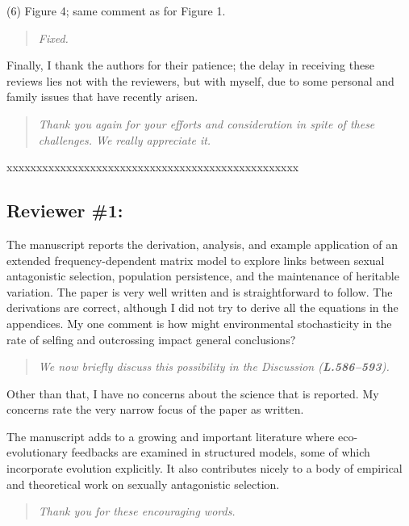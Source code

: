 \documentclass[11pt]{article}
\begin{document}
\noindent (6) Figure 4; same comment as for Figure 1.
\begin{quote}
	{\itshape Fixed.}
\end{quote}

Finally, I thank the authors for their patience; the delay in receiving these reviews lies not with the reviewers, but with myself, due to some personal and family issues that have recently arisen.

\begin{quote}
	{\itshape Thank you again for your efforts and consideration in spite of these challenges. We really appreciate it.}
\end{quote}


\noindent xxxxxxxxxxxxxxxxxxxxxxxxxxxxxxxxxxxxxxxxxxxxxxxxx

\subsection*{Reviewer \#1:}

The manuscript reports the derivation, analysis, and example application of an extended frequency-dependent matrix model to explore links between sexual antagonistic selection, population persistence, and the maintenance of heritable variation. The paper is very well written and is straightforward to follow. The derivations are correct, although I did not try to derive all the equations in the appendices. My one comment is how might environmental stochasticity in the rate of selfing and outcrossing impact general conclusions? 
\begin{quote}
	{\itshape We now briefly discuss this possibility in the Discussion ({\bf L.586--593}).}
\end{quote}


Other than that, I have no concerns about the science that is reported. My concerns rate the very narrow focus of the paper as written.

The manuscript adds to a growing and important literature where eco-evolutionary feedbacks are examined in structured models, some of which incorporate evolution explicitly. It also contributes nicely to a body of empirical and theoretical work on sexually antagonistic selection.

\begin{quote}
	{\itshape Thank you for these encouraging words.}
\end{quote}
\end{document}
